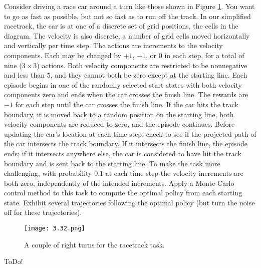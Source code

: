 
\begin{exercise}

Consider driving a race car around a turn like those shown in Figure \ref{fig:4.32}.
You want to go as fast as possible, but not so fast as to run off the track.
In our simplified racetrack, the car is at one of a discrete set of grid positions, the cells in the diagram.
The velocity is also discrete, a number of grid cells moved horizontally and vertically per time step.
The actions are increments to the velocity components.
Each may be changed by $+1$, $-1$, or $0$ in each step, for a total of nine ($3 \times 3$) actions.
Both velocity components are restricted to be nonnegative and less than $5$, and they cannot both be zero except at the starting line.
Each episode begins in one of the randomly selected start states with both velocity components zero and ends when the car crosses the finish line.
The rewards are $-1$ for each step until the car crosses the finish line.
If the car hits the track boundary, it is moved back to a random position on the starting line, both velocity components are reduced to zero, and the episode continues.
Before updating the car's location at each time step, check to see if the projected path of the car intersects the track boundary.
If it intersects the finish line, the episode ends;
if it intersects anywhere else, the car is considered to have hit the track boundary and is sent back to the starting line.
To make the task more challenging, with probability $0.1$ at each time step the velocity increments are both zero, independently of the intended increments.
Apply a Monte Carlo control method to this task to compute the optimal policy from each starting state.
Exhibit several trajectories following the optimal policy (but turn the noise off for these trajectories).

\setcounter{section}{5}
\setcounter{figure}{4}

\begin{figure}[H]
    \centering
    \texttt{[image: 3.32.png]}
    \caption{A couple of right turns for the racetrack task.}
    \label{fig:4.32}
\end{figure}

\end{exercise}


\begin{solution}

ToDo!

\end{solution}

